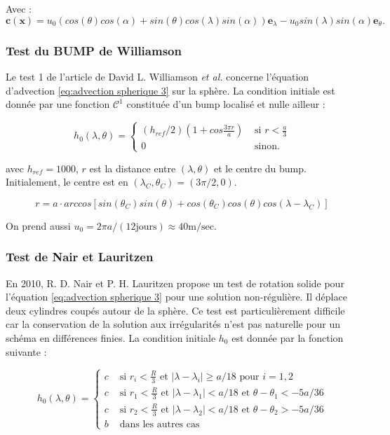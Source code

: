 Avec :
$$\mathbf{c} ( \mathbf{x} ) = u_0 ( cos ( \theta) cos ( \alpha ) + sin( \theta) cos ( \lambda) sin( \alpha) ) \mathbf{e}_{\lambda} - u_0 sin( \lambda) sin( \alpha) \mathbf{e}_{\theta}. $$

\subsubsection{Test du BUMP de Williamson}

Le test 1 de l'article de David L. Williamson \textit{et al.} \cite{Williamson1992} concerne l'équation d'advection \eqref{eq:advection spherique 3} sur la sphère. La condition initiale est donnée par une fonction $\mathcal{C}^1$ constituée d'un bump localisé et nulle ailleur :

\begin{equation}
h_0(\lambda, \theta) = 
\left\lbrace
\begin{array}{ll}
(h_{ref}/2) \left( 1+cos \frac{3 \pi r}{a} \right) & \text{ si } r<\frac{a}{3} \\
0 & \text{ sinon.}
\end{array}
\right.
\end{equation}

avec $h_{ref}=1000$, $r$ est la distance entre $(\lambda, \theta)$ et le centre du bump. Initialement, le centre est en $(\lambda_C, \theta_C) = (3 \pi /2, 0)$.

\begin{equation}
r = a \cdot arccos \left[ sin ( \theta_C) sin( \theta) + cos( \theta_C) cos ( \theta) cos ( \lambda - \lambda_C ) \right]
\end{equation}

On prend aussi $u_0 = 2  \pi a / (12 \text{jours} )\approx 40 \text{m/sec}$.

\subsubsection{Test de Nair et Lauritzen}

En 2010, R. D. Nair et P. H. Lauritzen \cite{Nair2010} propose un test de rotation solide pour l'équation \eqref{eq:advection spherique 3} pour une solution non-régulière. Il déplace deux cylindres coupés autour de la sphère. Ce test est particulièrement difficile car la conservation de la solution aux irrégularités n'est pas naturelle pour un schéma en différences finies. La condition initiale $h_0$ est donnée par la fonction suivante :

\begin{equation}
h_0(\lambda, \theta) = 
\left\lbrace
\begin{array}{ll}
c & \text{ si } r_i < \frac{R}{3} \text{ et } |\lambda - \lambda_i| \geq a/18 \text{ pour } i=1,2 \\
c & \text{ si } r_1 < \frac{R}{3} \text{ et } |\lambda - \lambda_1| < a/18 \text{ et } \theta-\theta_1 < -5a/36 \\
c & \text{ si } r_2 < \frac{R}{3} \text{ et } |\lambda - \lambda_2| < a/18 \text{ et } \theta-\theta_2 > -5a/36 \\
b &\text{ dans les autres cas }
\end{array}
\right.
\end{equation}

